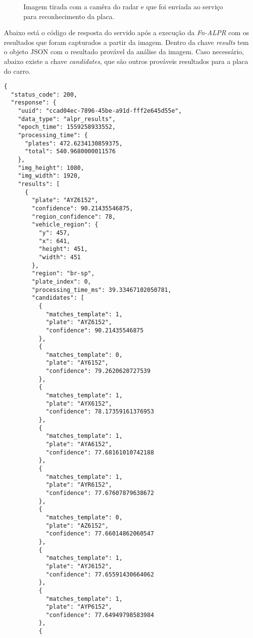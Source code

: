 \begin{figure}[!h]
	\caption{\label{fig:teste-alpr-foto-carro} Imagem tirada com a camêra do radar e que foi enviada ao serviço para reconhecimento da placa.}
\end{figure}

Abaixo está o código de resposta do servido após a execução da \textit{Fn-ALPR} com os resultados que foram capturados a partir da imagem. Dentro da chave \textit{results} tem o objeto JSON com o resultado provável da análise da imagem. Caso necessário, abaixo existe a chave \textit{candidates}, que são outros prováveis resultados para a placa do carro.

\begin{lstlisting}
{
  "status_code": 200,
  "response": {
    "uuid": "ccad04ec-7896-45be-a91d-fff2e645d55e",
    "data_type": "alpr_results",
    "epoch_time": 1559258933552,
    "processing_time": {
      "plates": 472.6234130859375,
      "total": 540.9680000011576
    },
    "img_height": 1080,
    "img_width": 1920,
    "results": [
      {
        "plate": "AYZ6152",
        "confidence": 90.21435546875,
        "region_confidence": 78,
        "vehicle_region": {
          "y": 457,
          "x": 641,
          "height": 451,
          "width": 451
        },
        "region": "br-sp",
        "plate_index": 0,
        "processing_time_ms": 39.33467102050781,
        "candidates": [
          {
            "matches_template": 1,
            "plate": "AYZ6152",
            "confidence": 90.21435546875
          },
          {
            "matches_template": 0,
            "plate": "AY6152",
            "confidence": 79.2620620727539
          },
          {
            "matches_template": 1,
            "plate": "AYX6152",
            "confidence": 78.17359161376953
          },
          {
            "matches_template": 1,
            "plate": "AYA6152",
            "confidence": 77.68161010742188
          },
          {
            "matches_template": 1,
            "plate": "AYR6152",
            "confidence": 77.67607879638672
          },
          {
            "matches_template": 0,
            "plate": "AZ6152",
            "confidence": 77.66014862060547
          },
          {
            "matches_template": 1,
            "plate": "AYJ6152",
            "confidence": 77.65591430664062
          },
          {
            "matches_template": 1,
            "plate": "AYP6152",
            "confidence": 77.64949798583984
          },
          {

\end{lstlisting}
